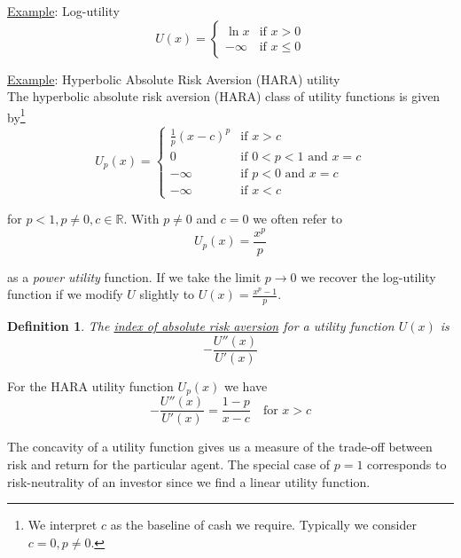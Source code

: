 \documentclass[12pt]{article}
\newtheorem{definition}{Definition}
\newlength\tindent
\renewcommand{\indent}{\hspace*{\tindent}}
\newcommand{\R}{\mathbb R}
\begin{document}
\underline{Example}: Log-utility \\
\begin{equation*}
	U(x) = 
	\begin{cases}
		\ln x & \text{if } x > 0 \\
		-\infty & \text{if } x \leq 0
	\end{cases}
\end{equation*}

\underline{Example}: Hyperbolic Absolute Risk Aversion (HARA) utility \\

The hyperbolic absolute risk aversion (HARA) class of utility functions is given by\footnote{We interpret $c$ as the baseline of cash we require. Typically we consider $c = 0, p \neq 0$.}
\begin{equation*}
	U_p(x) = 
	\begin{cases}
		\frac{1}{p}(x - c)^p & \text{if } x > c \\
		0 & \text{if } 0 < p < 1 \text{ and } x = c \\
		-\infty & \text{if } p < 0 \text{ and } x = c \\
		-\infty & \text{if } x < c
	\end{cases}
\end{equation*}

for $p < 1, p \neq 0, c \in \R$. With $p \neq 0$ and $c = 0$ we often refer to
\begin{equation*}
	U_p(x) = \frac{x^p}{p}
\end{equation*}

as a {\em power utility} function. If we take the limit $p \to 0$ we recover the log-utility function if we modify $U$ slightly to $U(x) = \frac{x^p - 1}{p}$. \\

\begin{definition} The \underline{index of absolute risk aversion} for a utility function $U(x)$ is
\begin{equation*}
	-\frac{U''(x)}{U'(x)}
\end{equation*}
\end{definition}

For the HARA utility function $U_p(x)$ we have
\begin{equation*}
	-\frac{U''(x)}{U'(x)} = \frac{1 - p}{x - c} \quad \text{for } x > c
\end{equation*}

\indent The concavity of a utility function gives us a measure of the trade-off between risk and return for the particular agent. The special case of $p = 1$ corresponds to risk-neutrality of an investor since we find a linear utility function. \\
\end{document}

